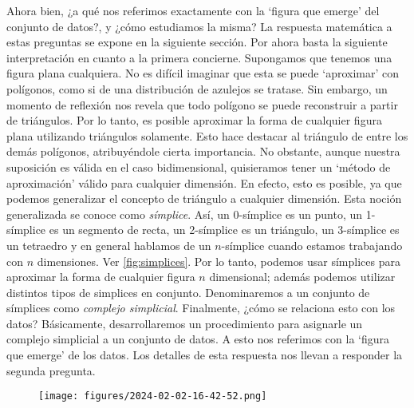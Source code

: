 \documentclass[a4paper,11pt]{article}
\begin{document}
Ahora bien, ¿a qué nos referimos exactamente con la `figura que emerge' del conjunto de datos?, y ¿cómo estudiamos la misma?
La respuesta matemática a estas preguntas se expone en la siguiente sección.
Por ahora basta la siguiente interpretación en cuanto a la primera concierne. 
Supongamos que tenemos una figura plana  cualquiera. No es difícil imaginar que esta se puede `aproximar' con polígonos, como si de una distribución de azulejos se tratase. Sin embargo, un momento de reflexión nos revela que todo polígono se puede reconstruir a partir de triángulos.
Por lo tanto, es posible aproximar la forma de cualquier figura plana utilizando triángulos solamente. Esto hace destacar al triángulo de entre los demás polígonos, atribuyéndole cierta importancia.
No obstante, aunque nuestra suposición es válida en el caso bidimensional, quisieramos tener un `método de aproximación' válido para cualquier dimensión. 
En efecto, esto es posible, ya que podemos  generalizar el concepto de triángulo a cualquier dimensión.  Esta noción generalizada se conoce como \textit{símplice}. Así, un 0-símplice es un punto, un 1-símplice es un segmento de recta, un 2-símplice es un triángulo, un 3-símplice es un tetraedro y en general hablamos de un \(n\)-símplice cuando estamos trabajando con \(n\) dimensiones. Ver \autoref{fig:simplices}.
Por lo tanto,  podemos usar símplices para aproximar la forma de cualquier figura \(n\) dimensional; además podemos utilizar distintos tipos de simplices en conjunto. Denominaremos a un  conjunto de símplices como \textit{complejo simplicial}.
Finalmente, ¿cómo se relaciona esto con los datos? Básicamente, desarrollaremos un procedimiento para asignarle un complejo simplicial a un conjunto de datos. A esto nos referimos con la `figura que emerge' de los datos. Los detalles de esta respuesta nos llevan a responder la segunda pregunta.


\begin{figure}[!htb]
    \centering
    \texttt{[image: figures/2024-02-02-16-42-52.png]}
    \caption{}\label{fig:simplices}
\end{figure}
\end{document}
